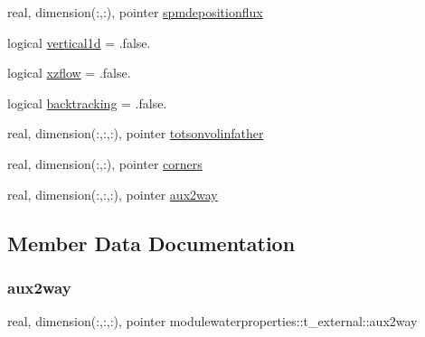 \begin{DoxyCompactItemize}
\item 
real, dimension(\+:,\+:), pointer \mbox{\hyperlink{structmodulewaterproperties_1_1t__external_a041d06ac7d0a8a693798bf0b7e30b892}{spmdepositionflux}}
\item 
logical \mbox{\hyperlink{structmodulewaterproperties_1_1t__external_a1fb4b7f6bce6efce307e6527f365bbfc}{vertical1d}} = .false.
\item 
logical \mbox{\hyperlink{structmodulewaterproperties_1_1t__external_aa9c38a7b5519eaf6d37dfb056e43e513}{xzflow}} = .false.
\item 
logical \mbox{\hyperlink{structmodulewaterproperties_1_1t__external_a48145eb85e2eeeb0b180d1206b9db6ae}{backtracking}} = .false.
\item 
real, dimension(\+:,\+:,\+:), pointer \mbox{\hyperlink{structmodulewaterproperties_1_1t__external_a55b0c253b259039a70479336c2d8767c}{totsonvolinfather}}
\item 
real, dimension(\+:,\+:), pointer \mbox{\hyperlink{structmodulewaterproperties_1_1t__external_a53d8ebfd9b1e24a7453d3017280b3be3}{corners}}
\item 
real, dimension(\+:,\+:,\+:), pointer \mbox{\hyperlink{structmodulewaterproperties_1_1t__external_a112252fbff96fd69d8b4f89c3ebb9689}{aux2way}}
\end{DoxyCompactItemize}


\subsection{Member Data Documentation}
\mbox{\label{structmodulewaterproperties_1_1t__external_a112252fbff96fd69d8b4f89c3ebb9689}} 
\subsubsection{\texorpdfstring{aux2way}{aux2way}}
{\footnotesize\ttfamily real, dimension(\+:,\+:,\+:), pointer modulewaterproperties\+::t\+\_\+external\+::aux2way\hspace{0.3cm}{\ttfamily [private]}}

\mbox{\label{structmodulewaterproperties_1_1t__external_a48145eb85e2eeeb0b180d1206b9db6ae}} 
